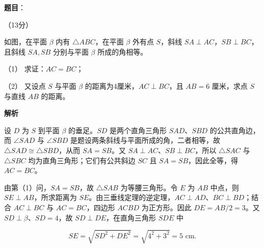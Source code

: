 \begin{answer}

\textbf{题目}：

（13分）

如图，在平面 $\beta$ 内有 $\triangle ABC$，在平面 $\beta$ 外有点 $S$，斜线 $SA\perp AC$，$SB\perp BC$，且斜线 $SA,SB$ 分别与平面 $\beta$ 所成的角相等。

（1） 求证：$AC=BC$；

（2） 又设点 $S$ 与平面 $\beta$ 的距离为4厘米，$AC\perp BC$，且 $AB=6$ 厘米，求点 $S$ 与直线 $AB$ 的距离。
\nopagebreak[4]
\begin{center}\end{center}
\nopagebreak[4]
\textbf{解析}


设 $D$ 为 $S$ 到平面 $\beta$ 的垂足。$SD$ 是两个直角三角形 $SAD$、$SBD$ 的公共直角边，而 $\angle SAD$ 与 $\angle SBD$ 是题设两条斜线与平面所成的角，二者相等，故 $\triangle SAD\cong\triangle SBD$，从而 $SA=SB$。又 $SA\perp AC$、$SB\perp BC$，所以 $\triangle SAC$ 与 $\triangle SBC$ 均为直角三角形；它们有公共斜边 $SC$ 且 $SA=SB$，因此全等，得 $AC=BC$。


由第（1）问，$SA=SB$，故 $\triangle SAB$ 为等腰三角形。令 $E$ 为 $AB$ 中点，则 $SE\perp AB$，所求距离为 $SE$。由三垂线定理的逆定理，$AC\perp AD$、$BC\perp BD$；结合 $AC\perp BC$ 与 $AC=BC$，四边形 $ACBD$ 为正方形。因此 $DE=AB/2=3$。又 $SD\perp\beta$、$SD=4$，故 $SD\perp DE$，在直角三角形 $SDE$ 中

\nopagebreak[4]
\[SE=\sqrt{SD^2+DE^2}=\sqrt{4^2+3^2}=5\text{ cm}.\]



\end{answer}
